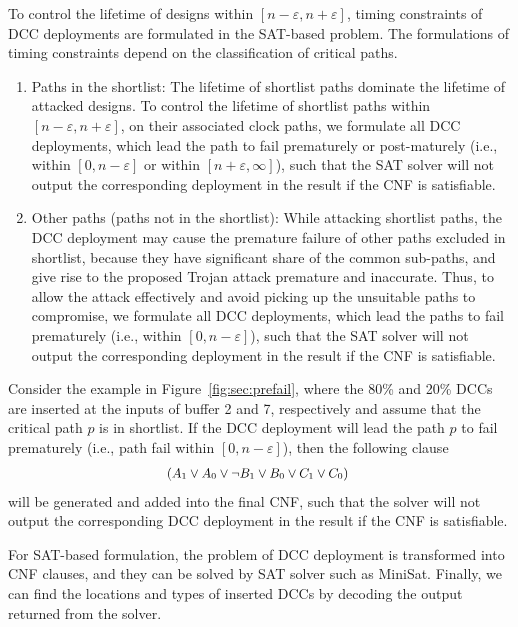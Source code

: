 To control the lifetime of designs within $[n - \varepsilon, n + \varepsilon]$, timing constraints of DCC deployments are formulated in the SAT-based problem. The formulations of timing constraints depend on the classification of critical paths.
\begin{enumerate}
	\item Paths in the shortlist: The lifetime of shortlist paths dominate the lifetime of attacked designs. To control the lifetime of shortlist paths within $[n - \varepsilon, n + \varepsilon]$, on their associated clock paths, we formulate all DCC deployments, which lead the path to fail prematurely or post-maturely (i.e., within $[ 0, n - \varepsilon]$ or within $[ n + \varepsilon, \infty]$), such that the SAT solver will not output the corresponding deployment in the result if the CNF is satisfiable.
	\item Other paths (paths not in the shortlist): While attacking shortlist paths, the DCC deployment may cause the premature failure of other paths excluded in shortlist, because they have significant share of the common sub-paths, and give rise to the proposed Trojan attack premature and inaccurate. Thus, to allow the attack effectively and avoid picking up the unsuitable paths to compromise, we formulate all DCC deployments, which lead the paths to fail prematurely (i.e., within $[ 0, n - \varepsilon]$), such that the SAT solver will not output the corresponding deployment in the result if the CNF is satisfiable.
\end{enumerate}

Consider the example in Figure~\ref{fig:sec:prefail}, where the 80\% and 20\% DCCs are inserted at the inputs of buffer 2 and 7, respectively and assume that the critical path $p$ is in shortlist. If the DCC deployment will lead the path $p$ to fail prematurely (i.e., path fail within $[ 0, n - \varepsilon]$), then the following clause
\begin{gather*}
	\fontsize{9}{7} \selectfont
	\mbox{($A_{1} \lor A_{0} \lor \neg B_{1} \lor B_{0} \lor C_{1} \lor C_{0}$) } 
\end{gather*}
will be generated and added into the final CNF, such that the solver will not output the corresponding DCC deployment in the result if the CNF is satisfiable.

For SAT-based formulation, the problem of DCC deployment is transformed into CNF clauses, and they can be solved by SAT solver such as MiniSat. Finally, we can find the locations and types of inserted DCCs by decoding the output returned from the solver.



